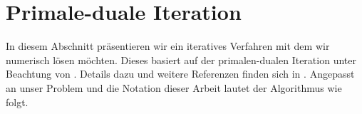 \section{Primale-duale Iteration}

In diesem Abschnitt präsentieren wir ein iteratives Verfahren mit dem wir
 numerisch lösen möchten. 
Dieses basiert auf der primalen-dualen Iteration \cite[S. 314, Algorithm
10.1]{Bar15} unter Beachtung von \cite[S. 314, Remark 10.11]{Bar15}. 
Details dazu und weitere Referenzen finden sich in \cites{Bar12}[S.
118-121]{Bar15}.
Angepasst an unser Problem und die Notation dieser Arbeit lautet der
Algorithmus wie folgt.

